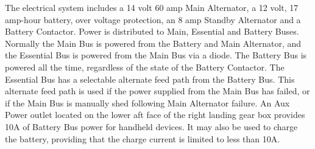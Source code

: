 The electrical system includes a 14 volt 60 amp Main Alternator, a 12 volt, 17 amp-hour battery, over voltage protection, an 8 amp Standby Alternator and a Battery Contactor. Power is distributed to Main, Essential and Battery Buses. Normally the Main Bus is powered from the Battery and Main Alternator, and the Essential Bus is powered from the Main Bus via a diode. The Battery Bus is powered all the time, regardless of the state of the Battery Contactor. The Essential Bus has a selectable alternate feed path from the Battery Bus. This alternate feed path is used if the power supplied from the Main Bus has failed, or if the Main Bus is manually shed following Main Alternator failure. An Aux Power outlet located on the lower aft face of the right landing gear box provides 10A of Battery Bus power for handheld devices. It may also be used to charge the battery, providing that the charge current is limited to less than 10A.

